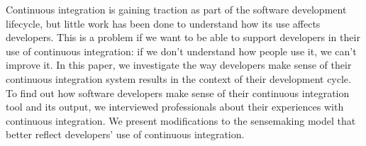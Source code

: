 \documentclass{sig-alternate}
\begin{document}
%
\author{
%
%
\alignauthor
Nicholas Nelson\\
       \\
       \\
\alignauthor
Charles Hill\\
       \\
       \\
}

\newcommand{\michael}{P1 }
\newcommand{\sruti}{P2 }
\newcommand{\caius}{P3 }
\newcommand{\srutitwo}{P4 }
\newcommand{\david}{P5 }
\newcommand{\cpg}{P6 }

\maketitle
\begin{abstract}
\end{abstract}
Continuous integration is gaining traction as part of the software development lifecycle, but little work has been done to understand how its use affects developers.
This is a problem if we want to be able to support developers in their use of continuous integration: if we don't understand how people use it, we can't improve it.
 In this paper, we investigate the way developers make sense of their continuous integration system results in the context of their development cycle. To find out how software developers make sense of their continuous integration tool and its output, we interviewed professionals about their experiences with continuous integration.
We present modifications to the sensemaking model that better reflect developers' use of continuous integration.
\smallskip
\end{document}
